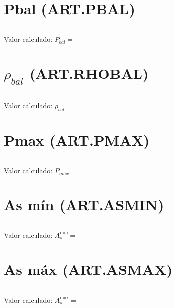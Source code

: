 \documentclass[12pt]{article}
\begin{document}
\section*{Pbal (ART.PBAL)}

\[

\]

Valor calculado: \( P_{bal} =  \)



\vspace{0.5cm}

\section*{\ensuremath{\rho_{bal}} (ART.RHOBAL)}

\[

\]

Valor calculado: \( \rho_{bal} =  \)



\vspace{0.5cm}

\section*{Pmax (ART.PMAX)}

\[

\]

Valor calculado: \( P_{max} =  \)



\vspace{0.5cm}

\section*{As m\'in (ART.ASMIN)}

\[

\]

Valor calculado: \( A_{s}^{\text{min}} =  \)



\vspace{0.5cm}

\section*{As m\'ax (ART.ASMAX)}

\[

\]

Valor calculado: \( A_{s}^{\text{max}} =  \)
\end{document}
